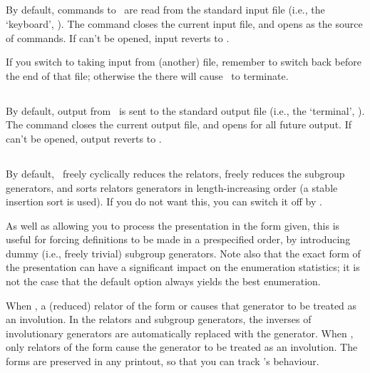 \subsection{}

By default, commands to \ace\ are read from the standard input file
  (i.e., the `keyboard'\kern-1.5pt, ).
The  command closes the current input file, and opens
   as the source of commands.
If  can't be opened, input reverts to .

If you switch to taking input from (another) file, remember to switch back
  before the end of that file; otherwise the  there will cause
  \ace\ to terminate.

\subsection{}

By default, output from \ace\ is sent to the standard output file
  (i.e., the `terminal'\kern-1.5pt, ).
The  command closes the current output file, and opens
   for all future output.
If  can't be opened, output reverts to .

\subsection{}

By default, \ace\ freely \amp cyclically reduces the relators, freely
  reduces the subgroup generators, and sorts relators \amp generators
  in length-increasing order (a stable insertion sort is used).
If you do not want this, you can switch it off by .

As well as allowing you to process the presentation in the form given, this
  is useful for forcing definitions to be made in a prespecified order, by
  introducing dummy (i.e., freely trivial) subgroup generators.
Note also that the exact form of the presentation can have a significant
  impact on the enumeration statistics; it is not the case that the 
  default option always yields the best enumeration.

When , a (reduced) relator of the form  or  
  causes that generator to be treated as an involution.
In the relators and subgroup generators, the inverses of involutionary
  generators are automatically replaced with the generator.
When , only relators of the form  cause the 
  generator to be treated as an involution.
The forms  \amp {} are preserved in any printout, so
  that you can track \ace's behaviour.

